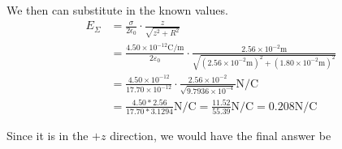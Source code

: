 \documentclass[12pt]{article}
\begin{document}
We then can substitute in the known values.
\begin{align*}
    E_\Sigma    &=  \frac{\sigma}{2\epsilon_0}\cdot\frac{z}{\sqrt{z^2 + R^2}}\\
        &=  \frac{4.50 \times 10^{-12} \unit{\coulomb/\meter}}{2\varepsilon_0} \cdot \frac{2.56 \times 10^{-2} \unit{\meter}}{\sqrt{\left(2.56 \times 10^{-2} \unit{\meter}\right)^2 + \left(1.80 \times 10^{-2} \unit{\meter}\right)^2}}\\
        &=  \frac{4.50 \times 10^{-12}}{17.70 \times 10^{-12}} \cdot \frac{2.56 \times 10^{-2}}{\sqrt{9.7936 \times 10^{-4}}} \unit{\newton/\coulomb}\\
        &=  \frac{4.50*2.56}{17.70*3.1294} \unit{\newton/\coulomb}
        =   \frac{11.52}{55.39} \unit{\newton/\coulomb}
        =   0.208 \unit{\newton/\coulomb}
\end{align*}

Since it is in the $+z$ direction, we would have the final answer be 
\end{document}
